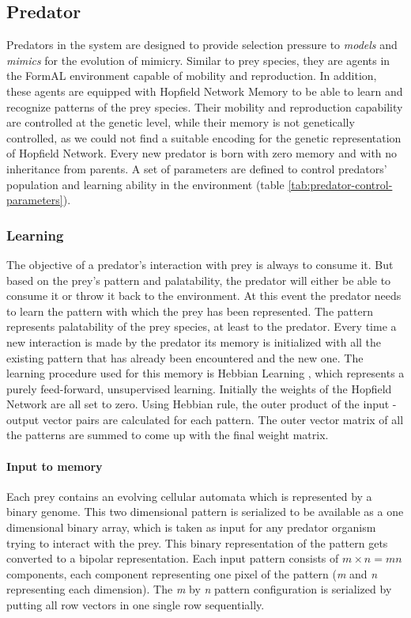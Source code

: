 \documentclass[letterpaper]{article}
\numberwithin{equation}{section}
\begin{document}
\subsection{Predator}

Predators in the system are designed to provide selection pressure to \textit{models} and \textit{mimics} for the evolution of mimicry. Similar to prey species, they are agents in the FormAL environment capable of mobility and reproduction. In addition, these agents are equipped with Hopfield Network Memory to be able to learn and recognize patterns of the prey species. Their mobility and reproduction capability are controlled at the genetic level, while their memory is not genetically controlled, as we could not find a suitable encoding for the genetic representation of Hopfield Network. Every new predator is born with zero memory and with no inheritance from parents. A set of parameters are defined to control predators' population and learning ability in the environment (table \ref{tab:predator-control-parameters}).

\subsubsection{Learning}
The objective of a predator's interaction with prey is always to consume it. But based on the prey's pattern and palatability, the predator will either be able to consume it or throw it back to the environment. At this event the predator needs to learn the pattern with which the prey has been represented. The pattern represents palatability of the prey species, at least to the predator. Every time a new interaction is made by the predator its memory is initialized with all the existing pattern that has already been encountered and the new one. The learning procedure used for this memory is Hebbian Learning \citep{hebb1949}, which represents a purely feed-forward, unsupervised learning. Initially the weights of the Hopfield Network are all set to zero. Using Hebbian rule, the outer product of the input - output vector pairs are calculated for each pattern. The outer vector matrix of all the patterns are summed to come up with the final weight matrix.

\paragraph{Input to memory}
Each prey contains an evolving cellular automata which is represented by a binary genome. This two dimensional pattern is serialized to be available as a one dimensional binary array, which is taken as input for any predator organism trying to interact with the prey. This binary representation of the pattern gets converted to a bipolar representation. Each input pattern consists of \(\textit{m} \times \textit{n} = \textit{mn}\) components, each component representing one pixel of the pattern (\textit{m} and \textit{n} representing each dimension). The \textit{m} by \textit{n} pattern configuration is serialized by putting all row vectors in one single row sequentially.
\end{document}
